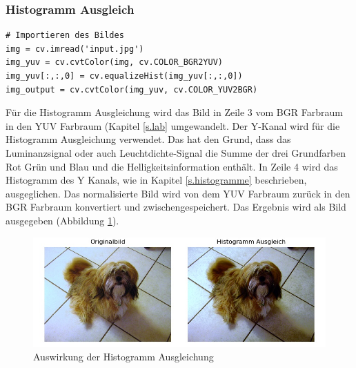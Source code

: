 \subsubsection{Histogramm Ausgleich}
\begin{lstlisting}
# Importieren des Bildes
img = cv.imread('input.jpg')
img_yuv = cv.cvtColor(img, cv.COLOR_BGR2YUV)
img_yuv[:,:,0] = cv.equalizeHist(img_yuv[:,:,0])
img_output = cv.cvtColor(img_yuv, cv.COLOR_YUV2BGR)
\end{lstlisting}
Für die Histogramm Ausgleichung \cite{histogram2012equalisation} wird das Bild in Zeile 3 vom BGR Farbraum in den YUV Farbraum (Kapitel \ref{s.lab} umgewandelt. Der Y-Kanal wird für die Histogramm Ausgleichung verwendet. Das hat den Grund, dass das Luminanzsignal oder auch Leuchtdichte-Signal die Summe der drei Grundfarben Rot Grün und Blau und die Helligkeitsinformation enthält. In Zeile 4 wird das Histogramm des Y Kanals, wie in Kapitel \ref{s.histogramme} beschrieben, ausgeglichen. Das normalisierte Bild wird von dem YUV Farbraum zurück in den BGR Farbraum konvertiert und zwischengespeichert. Das Ergebnis wird als Bild ausgegeben (Abbildung \ref{img:histogrameq}).
\begin{figure}
	[h]
	\centering
	\includegraphics[scale=0.7]{Sources/histeq.jpg}
	\caption{Auswirkung der Histogramm Ausgleichung}
	\label{img:histogrameq}
\end{figure}	
